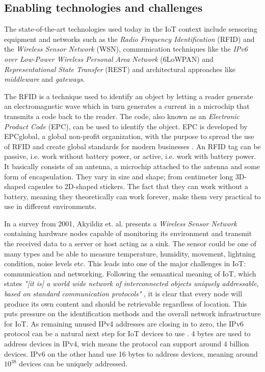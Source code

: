 \subsection{Enabling technologies and challenges}

The state-of-the-art technologies used today in the IoT context include
sensoring equipment and networks such as the \textit{Radio Frequency
Identification} (RFID) and the \textit{Wireless Sensor Network} (WSN),
communication techniques like the \textit{IPv6 over Low-Power Wireless Personal
Area Network} (6LoWPAN) and \textit{Representational State Transfer} (REST) and
architectural approaches like \textit{middleware} and \textit{gateways}.

The RFID is a technique used to identify an object by letting a reader generate
an electromagnetic wave which in turn generates a current in a microchip that
transmits a code back to the reader. The code, also known as an
\textit{Electronic Product Code} (EPC), can be used to identify the object. EPC
is developed by EPCglobal, a global non-profit organization, with the purpose
to spread the use of RFID and create global standards for modern businesses
\cite{atzori2010internet}. An RFID tag can be passive, i.e. work without
battery power, or active, i.e. work with battery power. It basically consists
of an antenna, a microchip attached to the antenna and some form of
encapsulation. They vary in size and shape; from centimeter long 3D-shaped
capsules to 2D-shaped stickers. The fact that they can work without a battery,
meaning they theoretically can work forever, make them very practical to use in
different environments. \cite{want2006introduction}

In a survey from 2001, Akyildiz et. al.  \cite{akyildiz2002wireless} presents a
\textit{Wireless Sensor Network} containing hardware nodes capable of
monitoring its environment and transmit the received data to a server or host
acting as a sink. The sensor could be one of many types and be able to measure
temperature, humidity, movement, lightning condition, noise levels etc. This
leads into one of the major challenges in IoT: communication and networking.
Following the semantical meaning of IoT, which states \textit{"[it is] a world
wide network of interconnected objects uniquely addressable, based on standard
communication protocols"} \cite{bassi2008internet}, it is clear that every node
will produce its own content and should be retrievable regardless of location.
This puts pressure on the identification methods and the overall network
infrastructure for IoT. As remaining unused IPv4 addresses are closing in to
zero, the IPv6 protocol can be a natural next step for IoT devices to use
\cite{atzori2010internet}. 4 bytes are used to address devices in IPv4, wich
means the protocol can support around 4 billion devices. IPv6 on the other hand
use 16 bytes to address devices, meaning around $10^{38}$ devices can be
uniquely addressed.

